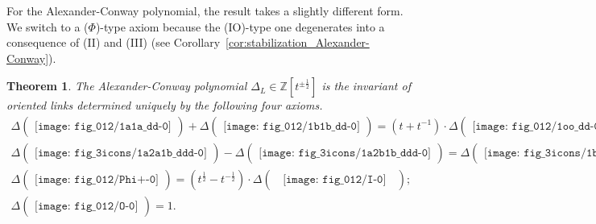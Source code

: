 \documentclass[12pt]{amsart}
\newtheorem{thm}{Theorem}[section]
\theoremstyle{definition}
\theoremstyle{remark}
\begin{document}
For the Alexander-Conway polynomial, the result takes a slightly different form.
We switch to a ($\Phi$)-type axiom because the (IO)-type one degenerates into a
consequence of (II) and (III) (see Corollary~\ref{cor:stabilization_Alexander-Conway}).

\begin{thm}
\label{thm:Alexander-Conway}
The Alexander-Conway polynomial $\Delta_L \in \mathbb Z[t^{\pm\frac12}]$ is
the invariant of oriented links
determined uniquely by the following four axioms.
{\allowdisplaybreaks
\begin{gather*}
\Delta
\begin{pmatrix}
\texttt{[image: fig\_012/1a1a\_dd-0]}
\end{pmatrix}
+ \Delta
\begin{pmatrix}
\texttt{[image: fig\_012/1b1b\_dd-0]}
\end{pmatrix}
=(t+t^{-1})
\cdot \Delta
\begin{pmatrix}
\texttt{[image: fig\_012/1oo\_dd-0]}
\end{pmatrix} ;
\tag*{\rm(II$_\Delta$)}
\\
\Delta
\begin{pmatrix}
\texttt{[image: fig\_3icons/1a2a1b\_ddd-0]}
\end{pmatrix}
- \Delta
\begin{pmatrix}
\texttt{[image: fig\_3icons/1a2b1b\_ddd-0]}
\end{pmatrix}
=
\Delta
\begin{pmatrix}
\texttt{[image: fig\_3icons/1b2a1a\_ddd-0]}
\end{pmatrix}
- \Delta
\begin{pmatrix}
\texttt{[image: fig\_3icons/1b2b1a\_ddd-0]}
\end{pmatrix} ;
\tag*{\rm(III$_\Delta$)}
\\
\Delta
\begin{pmatrix}
\texttt{[image: fig\_012/Phi+-0]}
\end{pmatrix}
=(t^{\frac12}-t^{-\frac12})\cdot
\Delta
\begin{pmatrix}
\;\;
\texttt{[image: fig\_012/I-0]}
\;\;
\end{pmatrix} ;
\tag*{($\Phi_\Delta$)}
\\
\Delta
\begin{pmatrix}
\texttt{[image: fig\_012/O-0]}
\end{pmatrix}
=1 .
\tag*{\rm(O$_\Delta$)}
\end{gather*}
}
\end{thm}
\end{document}
